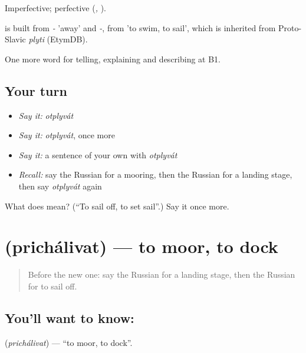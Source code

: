 Imperfective; perfective \emph{} (\emph{, }).

\begin{cousinweb}
\emph{} is built from \emph{-} 'away' and \emph{-}, from \emph{} 'to swim, to sail', which is inherited from Proto-Slavic \emph{plyti} (EtymDB).
\end{cousinweb}

\begin{grammarlens}[title={What you've built}]
One more word for telling, explaining and describing at B1.
\end{grammarlens}

\subsection*{Your turn}
\begin{itemize}
\raggedright
  \item \emph{Say it:} \emph{otplyvát}
  \item \emph{Say it:} \emph{otplyvát}, once more
  \item \emph{Say it:} a sentence of your own with \emph{otplyvát}
  \item \emph{Recall:} say the Russian for a mooring, then the Russian for a landing stage, then say \emph{otplyvát} again
\end{itemize}

\begin{tcolorbox}[breakable,colback=teal!4,colframe=teal!35!black,title={Before you move on}]
What does  mean? (\textquotedblleft{}To sail off, to set sail\textquotedblright{}.) Say it once more.
\end{tcolorbox}
\section[\texorpdfstring{\ru{причаливать} (prichálivat)}{причаливать (prichálivat)}]{ (prichálivat) — to moor, to dock}

\label{lesson:RU-C425-prichalivat}



\begin{quote}
Before the new one: say the Russian for a landing stage, then the Russian for to sail off.
\end{quote}

\subsection*{You'll want to know: }
\textbf{} (\emph{prichálivat}) — \textquotedblleft{}to moor, to dock\textquotedblright{}.

